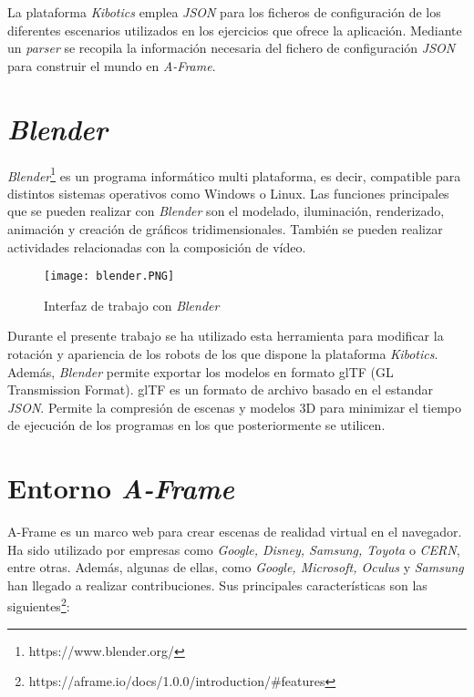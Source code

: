 La plataforma \textit{Kibotics} emplea \textit{JSON} para los ficheros de configuración de los diferentes escenarios utilizados en los ejercicios que ofrece la aplicación. Mediante un \textit{parser} se recopila la información necesaria del fichero de configuración \textit{JSON} para construir el mundo en \textit{A-Frame}.

\section{\textit{Blender}}
\textit{Blender}\footnote{https://www.blender.org/} es un programa informático multi plataforma, es decir, compatible para distintos sistemas operativos como Windows o Linux. Las funciones principales que se pueden realizar con \textit{Blender} son el modelado, iluminación, renderizado, animación y creación de gráficos tridimensionales. También se pueden realizar actividades relacionadas con la composición de vídeo. 

\begin{figure}[h!]
    \centering
    \texttt{[image: blender.PNG]} 
    \caption{Interfaz de trabajo con \textit{Blender}}
    \label{fig:blender}
\end{figure}

Durante el presente trabajo se ha utilizado esta herramienta para modificar la rotación y apariencia de los robots de los que dispone la plataforma \textit{Kibotics}. Además, \textit{Blender} permite exportar los modelos en formato glTF (GL Transmission Format). glTF es un formato de archivo basado en el estandar \textit{JSON}. Permite la compresión de escenas y modelos 3D para minimizar el tiempo de ejecución de los programas en los que posteriormente se utilicen.

\section{Entorno \textit{A-Frame}}
A-Frame es un marco web para crear escenas de realidad virtual en el navegador. Ha sido utilizado por empresas como \textit{Google, Disney, Samsung, Toyota} o \textit{CERN}, entre otras. Además, algunas de ellas, como \textit{Google, Microsoft, Oculus} y \textit{Samsung} han llegado a realizar contribuciones. Sus principales características son las siguientes\footnote{https://aframe.io/docs/1.0.0/introduction/#features}:

